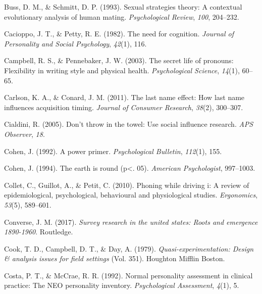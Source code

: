 \documentclass[
]{krantz}
\newlength{\cslhangindent}
\newlength{\cslentryspacingunit} %
\newenvironment{CSLReferences}[2] %
 {%
  \setlength{\parindent}{0pt}
  \ifodd #1
  \let\oldpar\par
  \def\par{\hangindent=\cslhangindent\oldpar}
  \fi
  \setlength{\parskip}{#2\cslentryspacingunit}
 }%
 {}
\begin{document}
\begin{CSLReferences}{1}{0}
\leavevmode{}%
Buss, D. M., \& Schmitt, D. P. (1993). Sexual strategies theory: A contextual evolutionary analysis of human mating. \emph{Psychological Review}, \emph{100}, 204--232.

\leavevmode{}%
Cacioppo, J. T., \& Petty, R. E. (1982). The need for cognition. \emph{Journal of Personality and Social Psychology}, \emph{42}(1), 116.

\leavevmode{}%
Campbell, R. S., \& Pennebaker, J. W. (2003). The secret life of pronouns: Flexibility in writing style and physical health. \emph{Psychological Science}, \emph{14}(1), 60--65.

\leavevmode{}%
Carlson, K. A., \& Conard, J. M. (2011). The last name effect: How last name influences acquisition timing. \emph{Journal of Consumer Research}, \emph{38}(2), 300--307.

\leavevmode{}%
Cialdini, R. (2005). Don't throw in the towel: Use social influence research. \emph{APS Observer}, \emph{18}.

\leavevmode{}%
Cohen, J. (1992). A power primer. \emph{Psychological Bulletin}, \emph{112}(1), 155.

\leavevmode{}%
Cohen, J. (1994). The earth is round (p\textless. 05). \emph{American Psychologist}, 997--1003.

\leavevmode{}%
Collet, C., Guillot, A., \& Petit, C. (2010). Phoning while driving i: A review of epidemiological, psychological, behavioural and physiological studies. \emph{Ergonomics}, \emph{53}(5), 589--601.

\leavevmode{}%
Converse, J. M. (2017). \emph{Survey research in the united states: Roots and emergence 1890-1960}. Routledge.

\leavevmode{}%
Cook, T. D., Campbell, D. T., \& Day, A. (1979). \emph{Quasi-experimentation: Design \& analysis issues for field settings} (Vol. 351). Houghton Mifflin Boston.

\leavevmode{}%
Costa, P. T., \& McCrae, R. R. (1992). Normal personality assessment in clinical practice: The NEO personality inventory. \emph{Psychological Assessment}, \emph{4}(1), 5.


\end{CSLReferences}
\end{document}
